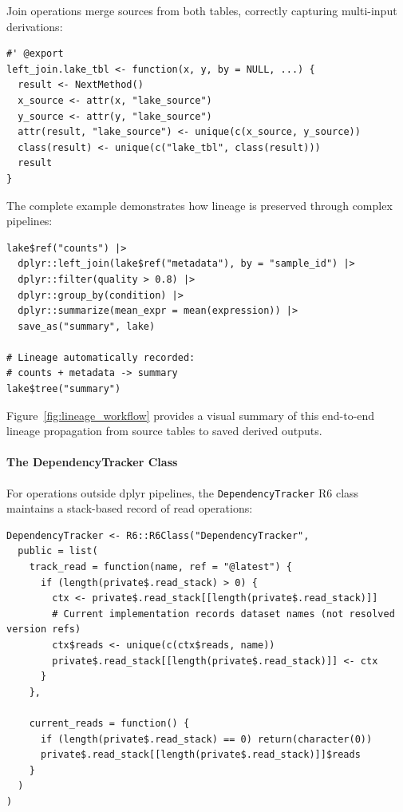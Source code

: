 \documentclass[11pt,a4paper]{article}
\begin{document}
Join operations merge sources from both tables, correctly capturing multi-input derivations:

\begin{lstlisting}[caption={Join operations merge lineage sources}]
#' @export
left_join.lake_tbl <- function(x, y, by = NULL, ...) {
  result <- NextMethod()
  x_source <- attr(x, "lake_source")
  y_source <- attr(y, "lake_source")
  attr(result, "lake_source") <- unique(c(x_source, y_source))
  class(result) <- unique(c("lake_tbl", class(result)))
  result
}
\end{lstlisting}

The complete example demonstrates how lineage is preserved through complex pipelines:

\begin{lstlisting}[caption={Automatic lineage tracking through dplyr pipelines}]
lake$ref("counts") |>
  dplyr::left_join(lake$ref("metadata"), by = "sample_id") |>
  dplyr::filter(quality > 0.8) |>
  dplyr::group_by(condition) |>
  dplyr::summarize(mean_expr = mean(expression)) |>
  save_as("summary", lake)

# Lineage automatically recorded:
# counts + metadata -> summary
lake$tree("summary")
\end{lstlisting}

Figure~\ref{fig:lineage_workflow} provides a visual summary of this end-to-end lineage propagation from source tables to saved derived outputs.


\paragraph{The DependencyTracker Class}
For operations outside dplyr pipelines, the \texttt{DependencyTracker} R6 class maintains a stack-based record of read operations:

\begin{lstlisting}[caption={DependencyTracker implementation}]
DependencyTracker <- R6::R6Class("DependencyTracker",
  public = list(
    track_read = function(name, ref = "@latest") {
      if (length(private$.read_stack) > 0) {
        ctx <- private$.read_stack[[length(private$.read_stack)]]
        # Current implementation records dataset names (not resolved version refs)
        ctx$reads <- unique(c(ctx$reads, name))
        private$.read_stack[[length(private$.read_stack)]] <- ctx
      }
    },

    current_reads = function() {
      if (length(private$.read_stack) == 0) return(character(0))
      private$.read_stack[[length(private$.read_stack)]]$reads
    }
  )
)
\end{lstlisting}
\end{document}
